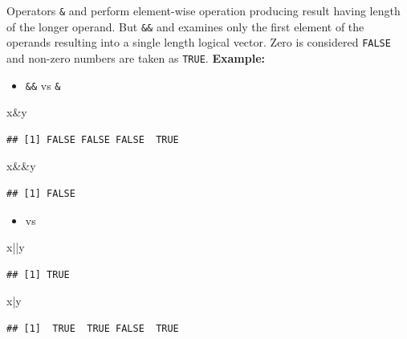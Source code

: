 \documentclass[]{article}
\def\tightlist{}
\newenvironment{Shaded}{\begin{snugshade}}{\end{snugshade}}
\newcommand{\NormalTok}[1]{{#1}}
\numberwithin{equation}{section}
\begin{document}
Operators \texttt{\&} and \texttt{\textbar{}} perform element-wise
operation producing result having length of the longer operand. But
\texttt{\&\&} and \texttt{\textbar{}\textbar{}} examines only the first
element of the operands resulting into a single length logical vector.
Zero is considered \texttt{FALSE} and non-zero numbers are taken as
\texttt{TRUE}. \textbf{Example:}

\begin{itemize}
\tightlist
\item
  \texttt{\&\&} vs \texttt{\&}
\end{itemize}

\begin{Shaded}
\begin{Highlighting}[]
\NormalTok{x&y}
\end{Highlighting}
\end{Shaded}

\begin{verbatim}
## [1] FALSE FALSE FALSE  TRUE
\end{verbatim}

\begin{Shaded}
\begin{Highlighting}[]
\NormalTok{x&&y}
\end{Highlighting}
\end{Shaded}

\begin{verbatim}
## [1] FALSE
\end{verbatim}

\begin{itemize}
\tightlist
\item
  \texttt{\textbar{}\textbar{}} vs \texttt{\textbar{}}
\end{itemize}

\begin{Shaded}
\begin{Highlighting}[]
\NormalTok{x||y}
\end{Highlighting}
\end{Shaded}

\begin{verbatim}
## [1] TRUE
\end{verbatim}

\begin{Shaded}
\begin{Highlighting}[]
\NormalTok{x|y}
\end{Highlighting}
\end{Shaded}

\begin{verbatim}
## [1]  TRUE  TRUE FALSE  TRUE
\end{verbatim}
\end{document}
